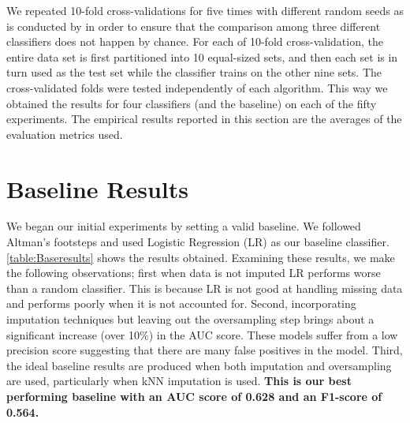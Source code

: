 \label{chap:Results}

We repeated 10-fold cross-validations for five times with different random seeds as is conducted by \cite{kim2010ensemble} in order to ensure that the comparison among three different classifiers does not happen by chance. For each of 10-fold cross-validation, the entire data set is first partitioned into 10 equal-sized sets, and then each set is in turn used as the test set while the classifier trains on the other nine sets. The cross-validated folds were tested independently of each algorithm. This way we obtained the results for four classifiers (and the baseline) on each of the fifty experiments. The empirical results reported in this section are the averages of the evaluation metrics used.

\section{Baseline Results}
We began our initial experiments by setting a valid baseline. We followed Altman's \cite{Altman} footsteps and used Logistic Regression (LR) as our baseline classifier. \autoref{table:Baseresults} shows the results obtained. Examining these results, we make the following observations;
first when data is not imputed LR performs worse than a random classifier. This is because LR is not good at handling missing data and performs poorly when it is not accounted for.
Second, incorporating imputation techniques but leaving out the oversampling step brings about a significant increase (over 10\%) in the AUC score. These models suffer from a low precision score suggesting that there are many false positives in the model.
Third, the ideal baseline results are produced when both imputation and oversampling are used, particularly when kNN imputation is used. \textbf{This is our best performing baseline with an AUC score of 0.628 and an F1-score of 0.564.}


